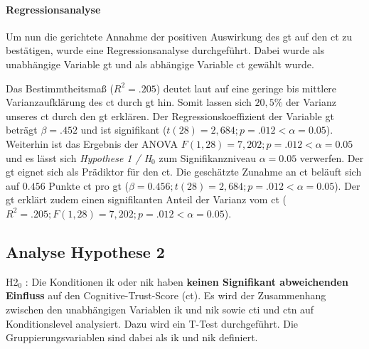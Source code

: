 \documentclass[a4paper,11pt]{article}%
\renewcommand{\\}{\vspace*{0.5\baselineskip} \newline}
\begin{document}
\paragraph{Regressionsanalyse}
Um nun die gerichtete Annahme der positiven Auswirkung des \ac{gt} auf den \ac{ct} zu bestätigen, wurde eine Regressionsanalyse durchgeführt. Dabei wurde als unabhängige Variable \ac{gt} und als abhängige Variable \ac{ct} gewählt wurde.
%

Das Bestimmtheitsmaß ($R^{2} = .205$) deutet laut \citep{cohen2013statistical} auf eine geringe bis mittlere Varianzaufklärung des \ac{ct} durch \ac{gt} hin. Somit lassen sich $20,5\%$ der Varianz unseres \ac{ct} durch den \ac{gt} erklären. \\
Der Regressionskoeffizient der Variable \ac{gt} beträgt $\beta = .452$ und ist signifikant ($t(28) = 2,684; p = .012 < \alpha = 0.05$). \\
Weiterhin ist das Ergebnis der ANOVA $F(1,28) = 7,202; p = .012 < \alpha = 0.05$ und es lässt sich \textit{Hypothese 1 / H$_{0}$} zum Signifikanzniveau $\alpha = 0.05$ verwerfen. \\
Der \ac{gt} eignet sich als Prädiktor für den \ac{ct}. Die geschätzte Zunahme an \ac{ct} beläuft sich auf $0.456$ Punkte \ac{ct} pro \ac{gt} ($\beta = 0.456; t(28) = 2,684; p = .012 < \alpha = 0.05$). \\
Der \ac{gt} erklärt zudem einen signifikanten Anteil der Varianz vom \ac{ct} ($R^{2} = .205; F(1,28) = 7,202; p = .012 < \alpha = 0.05$).


\newpage
	\subsection{Analyse Hypothese 2}
H2$_{0}$ : Die Konditionen \ac{ik} oder \ac{nik} haben \textbf{keinen Signifikant abweichenden Einfluss} auf den Cognitive-Trust-Score (\ac{ct}).\\
Es wird der Zusammenhang zwischen den unabhängigen Variablen \ac{ik} und \ac{nik} sowie \ac{cti} und \ac{ctn} auf Konditionslevel analysiert. Dazu wird ein T-Test durchgeführt. Die Gruppierungsvariablen sind dabei als \ac{ik} und \ac{nik} definiert.
\end{document}
